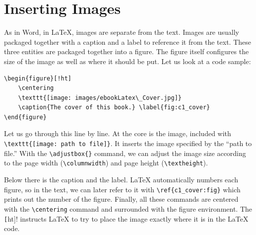\section{Inserting Images}\label{sec:c1_images}

As in Word, in \LaTeX{}, images are separate from the text. Images are usually
packaged together with a caption and a label to reference it from the text.
These three entities are packaged together into a figure. The figure itself
configures the size of the image as well as where it should be put. Let us look
at a code sample:
\begin{lstlisting}[language=Tex]
\begin{figure}[!ht]
    \centering
    \texttt{[image: images/ebookLatex\_Cover.jpg]}
    \caption{The cover of this book.} \label{fig:c1_cover}
\end{figure}
\end{lstlisting}

Let us go through this line by line. At the core is the image, included with
\lstinline[language=Tex]!\texttt{[image: path to file]}!. It inserts the image
specified by the ``path to file.'' With the
\lstinline[language=Tex]!\adjustbox{}! command, we can adjust the image size
according to the page width (\lstinline[language=Tex]!\columnwidth!) and page
height (\lstinline[language=Tex]!\textheight!). 

Below there is the caption and the label. \LaTeX{} automatically numbers each
figure, so in the text, we can later refer to it with
\lstinline[language=Tex]!\ref{c1_cover:fig}! which prints out the number of the
figure. Finally, all these commands are centered with the
\lstinline[language=Tex]!\centering! command and surrounded with the figure
environment. The \lstinline[language=Tex]![!ht]! instructs \LaTeX{} to try to
place the image exactly where it is in the \LaTeX{} code.

